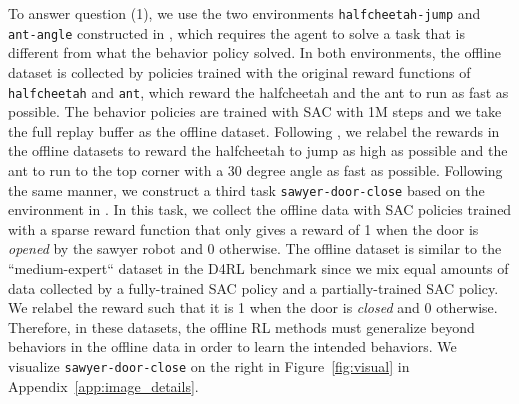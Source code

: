 \begin{table}
\centering
\scriptsize
{}
\vspace{-0.2cm}
\caption{
\footnotesize Average returns of \texttt{halfcheetah-jump} and \texttt{ant-angle} and average success rate of \texttt{sawyer-door-close} that require out-of-distribution generalization. All results are averaged over 3 random seeds. We include the mean and max undiscounted return / success rate of the episodes in the batch data (under Batch Mean and Batch Max, respectively) for comparison.
}
\vspace{-0.3cm}
\label{tbl:generalize}
\normalsize
\end{table}

To answer question (1), we use the two environments \texttt{halfcheetah-jump} and \texttt{ant-angle} constructed in \citet{yu2020mopo}, which requires the agent to solve a task that is different from what the behavior policy solved. In both environments, the offline dataset is collected by policies trained with the original reward functions of \texttt{halfcheetah} and \texttt{ant}, which reward the halfcheetah and the ant to run as fast as possible. The behavior policies are trained with SAC with 1M steps and we take the full replay buffer as the offline dataset. Following \citet{yu2020mopo}, we relabel the rewards in the offline datasets to reward the halfcheetah to jump as high as possible and the ant to run to the top corner with a 30 degree angle as fast as possible. Following the same manner, we construct a third task \texttt{sawyer-door-close} based on the environment in \citet{yu2020metaworld,Rafailov2020LOMPO}. In this task, we collect the offline data with SAC policies trained with a sparse reward function that only gives a reward of 1 when the door is \textit{opened} by the sawyer robot and 0 otherwise. The offline dataset is similar to the ``medium-expert`` dataset in the D4RL benchmark since we mix equal amounts of data collected by a fully-trained SAC policy and a partially-trained SAC policy. We relabel the reward such that it is 1 when the door is \textit{closed} and 0 otherwise. Therefore, in these datasets, the offline RL methods must generalize beyond behaviors in the offline data in order to learn the intended behaviors. We visualize \texttt{sawyer-door-close} on the right in Figure~\ref{fig:visual} in Appendix~\ref{app:image_details}.

